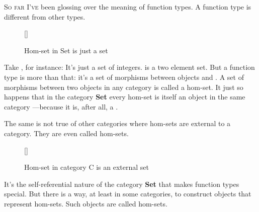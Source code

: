 \lettrine[lhang=0.17]{S}{o far I've} been glossing over the meaning of function types. A function
type is different from other types.

\begin{figure}
\raisebox{0pt}[\dimexpr{}\baselineskip\relax]{
}%
\caption{Hom-set in Set is just a set}
\end{figure}

Take , for instance: It's just a set of integers.
 is a two element set. But a function type
 is more than that: it's a set of morphisms
between objects  and . A set of morphisms between
two objects in any category is called a hom-set. It just so happens that
in the category \textbf{Set} every hom-set is itself an object in the
same category ---because it is, after all, a .

The same is not true of other categories where hom-sets are external to
a category. They are even called  hom-sets.

\pagebreak
\begin{figure}
\raisebox{0pt}[\dimexpr\height]{
}%
\caption{Hom-set in category C is an external set}
\end{figure}

\noindent
It's the self-referential nature of the category \textbf{Set} that makes
function types special. But there is a way, at least in some categories,
to construct objects that represent hom-sets. Such objects are called
 hom-sets.

